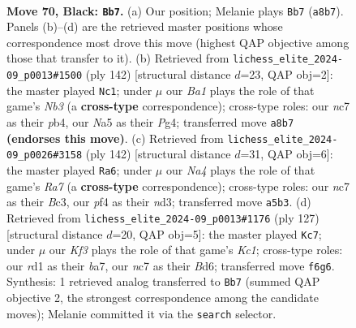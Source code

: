 \documentclass[11pt]{article}
\begin{document}
\clearpage

\begin{figure}[p]\centering
\begin{subfigure}{0.46\textwidth}\centering
\resizebox{\linewidth}{!}{%
\newchessgame
\chessboard[
  setfen={b7/P1N5/5k2/n7/1p3P2/6PB/4K2P/3R4 b - - 9 70},
  showmover=false,
  pgfstyle=straightmove, color=movearrow, markmove={a8-b7}
]}
\caption{}
\end{subfigure}\hfill
\begin{subfigure}{0.46\textwidth}\centering
\resizebox{\linewidth}{!}{%
\newchessgame
\chessboard[
  setfen={8/7p/7P/3kb1p1/1p4P1/1N1p4/4pK2/8 w - - 2 72},
  showmover=false,
  pgfstyle=straightmove, color=movearrow, markmove={b3-c1}
]}
\caption{}
\end{subfigure}
\\[4pt]
\begin{subfigure}{0.46\textwidth}\centering
\resizebox{\linewidth}{!}{%
\newchessgame
\chessboard[
  setfen={8/R7/3bkpp1/7p/7P/2Bn1b2/8/5K2 w - - 4 72},
  showmover=false,
  pgfstyle=straightmove, color=movearrow, markmove={a7-a6}
]}
\caption{}
\end{subfigure}\hfill
\begin{subfigure}{0.46\textwidth}\centering
\resizebox{\linewidth}{!}{%
\newchessgame
\chessboard[
  setfen={2k5/B7/2Pb3p/1K6/8/6Pp/7P/5R2 b - - 0 64},
  showmover=false,
  pgfstyle=straightmove, color=movearrow, markmove={c8-c7}
]}
\caption{}
\end{subfigure}
\caption{\textbf{Move 70, Black: \texttt{Bb7}.} (a) Our position; Melanie plays \texttt{Bb7} (\texttt{a8b7}). Panels (b)--(d) are the retrieved master positions whose correspondence most drove this move (highest QAP objective among those that transfer to it). (b) Retrieved from \texttt{lichess\_elite\_2024-09\_p0013\#1500} (ply 142) [structural distance $d$=23, QAP obj=2]: the master played \texttt{Nc1}; under $\mu$ our \emph{Ba1} plays the role of that game's \emph{Nb3} (a \textbf{cross-type} correspondence); cross-type roles: our \emph{n}c7 as their \emph{p}b4, our \emph{N}a5 as their \emph{P}g4; transferred move \texttt{a8b7} \textbf{(endorses this move)}. (c) Retrieved from \texttt{lichess\_elite\_2024-09\_p0026\#3158} (ply 142) [structural distance $d$=31, QAP obj=6]: the master played \texttt{Ra6}; under $\mu$ our \emph{Na4} plays the role of that game's \emph{Ra7} (a \textbf{cross-type} correspondence); cross-type roles: our \emph{n}c7 as their \emph{B}c3, our \emph{p}f4 as their \emph{n}d3; transferred move \texttt{a5b3}. (d) Retrieved from \texttt{lichess\_elite\_2024-09\_p0013\#1176} (ply 127) [structural distance $d$=20, QAP obj=5]: the master played \texttt{Kc7}; under $\mu$ our \emph{Kf3} plays the role of that game's \emph{Kc1}; cross-type roles: our \emph{r}d1 as their \emph{b}a7, our \emph{n}c7 as their \emph{B}d6; transferred move \texttt{f6g6}. Synthesis: 1 retrieved analog transferred to \texttt{Bb7} (summed QAP objective 2, the strongest correspondence among the candidate moves); Melanie committed it via the \texttt{search} selector.}
\label{fig:thought-m139}
\end{figure}
\end{document}
